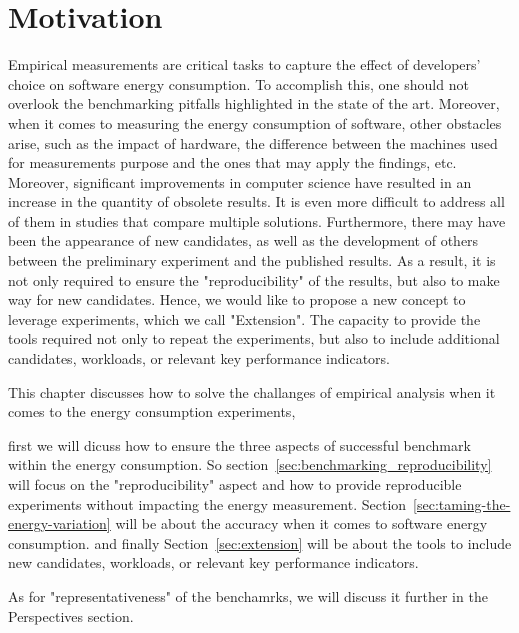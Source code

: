 
\section{Motivation}
Empirical measurements are critical tasks to capture the effect of developers' choice on software energy consumption.
To accomplish this, one should not overlook the benchmarking pitfalls highlighted in the state of the art.
Moreover, when it comes to measuring the energy consumption of software, other obstacles arise, such as the impact of hardware, the difference between the machines used for measurements purpose and the ones that may apply the findings, etc. 
Moreover, significant improvements in computer science have resulted in an increase in the quantity of obsolete results.
It is even more difficult to address all of them in studies that compare multiple solutions.
Furthermore, there may have been the appearance of new candidates, as well as the development of others between the preliminary experiment and the published results.
As a result, it is not only required to ensure the "reproducibility" of the results, but also to make way for new candidates.
Hence, we would like to propose a new concept to leverage experiments, which we call "Extension".
The capacity to provide the tools required not only to repeat the experiments, but also to include additional candidates, workloads, or relevant key performance indicators.

This chapter discusses how to solve the challanges of empirical analysis when it comes to the energy consumption experiments,

first we will dicuss how to ensure the three aspects of successful benchmark within the energy consumption. 
So section~\ref{sec:benchmarking_reproducibility} will focus on the "reproducibility" aspect and how to provide reproducible experiments without impacting the energy measurement. 
Section~\ref{sec:taming-the-energy-variation} will be about the accuracy when it comes to software energy consumption. and finally 
Section~\ref{sec:extension} will be about the tools to include new candidates, workloads, or relevant key performance indicators. 

As for "representativeness" of the benchamrks, we will discuss it further in the Perspectives section.
 




